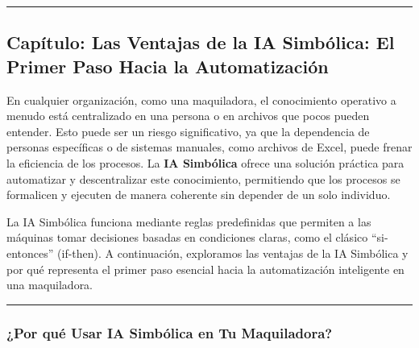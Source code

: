 \documentclass[
  10pt,
  letterpaper,
]{book}
\begin{document}
\begin{center}\rule{0.5\linewidth}{0.5pt}\end{center}

\subsection{Capítulo: Las Ventajas de la IA Simbólica: El Primer Paso
Hacia la
Automatización}\label{capuxedtulo-las-ventajas-de-la-ia-simbuxf3lica-el-primer-paso-hacia-la-automatizaciuxf3n}

En cualquier organización, como una maquiladora, el conocimiento
operativo a menudo está centralizado en una persona o en archivos que
pocos pueden entender. Esto puede ser un riesgo significativo, ya que la
dependencia de personas específicas o de sistemas manuales, como
archivos de Excel, puede frenar la eficiencia de los procesos. La
\textbf{IA Simbólica} ofrece una solución práctica para automatizar y
descentralizar este conocimiento, permitiendo que los procesos se
formalicen y ejecuten de manera coherente sin depender de un solo
individuo.

La IA Simbólica funciona mediante reglas predefinidas que permiten a las
máquinas tomar decisiones basadas en condiciones claras, como el clásico
``si-entonces'' (if-then). A continuación, exploramos las ventajas de la
IA Simbólica y por qué representa el primer paso esencial hacia la
automatización inteligente en una maquiladora.

\begin{center}\rule{0.5\linewidth}{0.5pt}\end{center}

\subsubsection{¿Por qué Usar IA Simbólica en Tu
Maquiladora?}\label{por-quuxe9-usar-ia-simbuxf3lica-en-tu-maquiladora}
\end{document}
